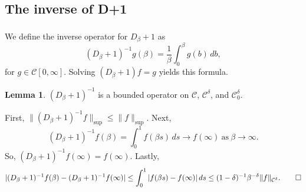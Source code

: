 \documentclass[11pt]{article}
\makeatletter
\renewenvironment{proof}[1][\proofname]{\par
  \vspace{-.7\topsep}%
  \pushQED{\qed}%
  \normalfont
  \topsep0pt \partopsep0pt %
  \trivlist
  \item[\hskip\labelsep
        \itshape
    #1\@addpunct{.}]\ignorespaces
}{%
  \popQED\endtrivlist\@endpefalse
  \addvspace{6pt plus 6pt} %
}
\theoremstyle{definition}
\newtheorem{lemma}[theorem]{Lemma}
\theoremstyle{remark}
\numberwithin{equation}{section}
\newcommand{\mcal}{\mathcal}
\newcommand{\tsub}{\textsubscript}
\newcommand{\norm}[1]{\lVert #1 \rVert}
\makeatother
\begin{document}
\subsection{The inverse of D\tsub{\textbeta}+1}
We define the inverse operator for $D_\beta + 1$ as
\[(D_\beta + 1)^{-1} g(\beta) = \frac{1}{\beta} \int_0^\beta g(b) \,db,\]
for $g\in \mcal{C}[0,\infty]$. Solving $(D_\beta + 1) f = g$ yields this formula.

\begin{lemma} \label{lem:4.4}
$(D_\beta + 1)^{-1}$ is a bounded operator on $\mcal{C}$, $\mcal{C}^\delta$, and $\mcal{C}^\delta_0$.
\end{lemma}
\begin{proof}
First, $\norm{(D_\beta + 1)^{-1} f}_{\sup} \leq \norm{f}_{\sup}$. Next,
\[(D_\beta + 1)^{-1} f(\beta) = \int_0^1 f(\beta s) \,ds \to f(\infty) ~\text{as}~ \beta \to \infty.\]
So, $(D_\beta + 1)^{-1} f(\infty) = f(\infty)$. Lastly,
\[|(D_\beta + 1)^{-1} f(\beta) - (D_\beta + 1)^{-1} f(\infty)| \leq \int_0^1 |f(\beta s) - f(\infty)| \,ds \leq (1-\delta)^{-1} \beta^{-\delta} \norm{f}_{\mcal{C}^\delta}. \qedhere\]
\end{proof}
\end{document}
